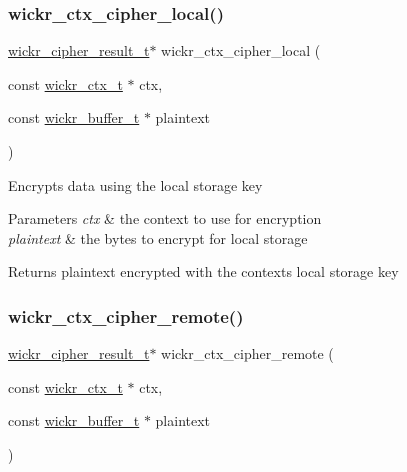 \subsubsection{\texorpdfstring{wickr\_ctx\_cipher\_local()}{wickr\_ctx\_cipher\_local()}}
{\footnotesize\ttfamily \mbox{\hyperlink{structwickr__cipher__result}{wickr\+\_\+cipher\+\_\+result\+\_\+t}}$\ast$ wickr\+\_\+ctx\+\_\+cipher\+\_\+local (\begin{DoxyParamCaption}\item[{const \mbox{\hyperlink{structwickr__ctx}{wickr\+\_\+ctx\+\_\+t}} $\ast$}]{ctx,  }\item[{const \mbox{\hyperlink{structwickr__buffer}{wickr\+\_\+buffer\+\_\+t}} $\ast$}]{plaintext }\end{DoxyParamCaption})}

Encrypts data using the local storage key


\begin{DoxyParams}{Parameters}
{\em ctx} & the context to use for encryption \\
\hline
{\em plaintext} & the bytes to encrypt for local storage \\
\hline
\end{DoxyParams}
\begin{DoxyReturn}{Returns}
\textquotesingle{}plaintext\textquotesingle{} encrypted with the context\textquotesingle{}s local storage key 
\end{DoxyReturn}
\mbox{\label{group__wickr__ctx_ga0b985fb2cd05fb482b5ed175dfd650a0}} 
\subsubsection{\texorpdfstring{wickr\_ctx\_cipher\_remote()}{wickr\_ctx\_cipher\_remote()}}
{\footnotesize\ttfamily \mbox{\hyperlink{structwickr__cipher__result}{wickr\+\_\+cipher\+\_\+result\+\_\+t}}$\ast$ wickr\+\_\+ctx\+\_\+cipher\+\_\+remote (\begin{DoxyParamCaption}\item[{const \mbox{\hyperlink{structwickr__ctx}{wickr\+\_\+ctx\+\_\+t}} $\ast$}]{ctx,  }\item[{const \mbox{\hyperlink{structwickr__buffer}{wickr\+\_\+buffer\+\_\+t}} $\ast$}]{plaintext }\end{DoxyParamCaption})}

